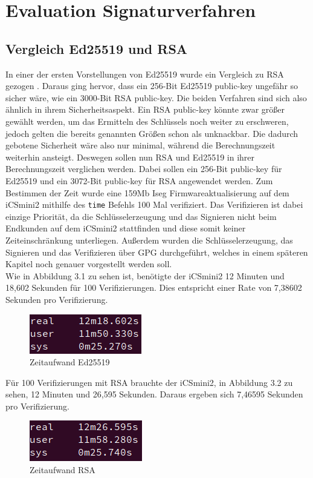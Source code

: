 \documentclass[thesis=bachelor,faculty=cb]{hsmw-thesis}
\begin{document}
\chapter{Evaluation Signaturverfahren}
\section{Vergleich Ed25519 und RSA}
In einer der ersten Vorstellungen von Ed25519 wurde ein Vergleich zu RSA gezogen \cite[Vgl. S.2]{ed25519_paper}. Daraus ging hervor, dass ein 256-Bit Ed25519 public-key ungefähr so sicher wäre, wie ein 3000-Bit RSA public-key. Die beiden Verfahren sind sich also ähnlich in ihrem Sicherheitsaspekt. Ein RSA public-key könnte zwar größer gewählt werden, um das Ermitteln des Schlüssels noch weiter zu erschweren, jedoch gelten die bereits genannten Größen schon als unknackbar. Die dadurch gebotene Sicherheit wäre also nur minimal, während die Berechnungszeit weiterhin ansteigt. Deswegen sollen nun RSA und Ed25519 in ihrer Berechnungszeit verglichen werden. Dabei sollen ein 256-Bit public-key für Ed25519 und ein 3072-Bit public-key für RSA angewendet werden. Zum Bestimmen der Zeit wurde eine 159Mb Iseg Firmwareaktualisierung auf dem iCSmini2 mithilfe des \texttt{time} Befehls 100 Mal verifiziert. Das Verifizieren ist dabei einzige Priorität, da die Schlüsselerzeugung und das Signieren nicht beim Endkunden auf dem iCSmini2 stattfinden und diese somit keiner Zeiteinschränkung unterliegen. Außerdem wurden die Schlüsselerzeugung, das Signieren und das Verifizieren über GPG durchgeführt, welches in einem späteren Kapitel noch genauer vorgestellt werden soll.
\\[1cm]
Wie in Abbildung 3.1 zu sehen ist, benötigte der iCSmini2 12 Minuten und 18,602 Sekunden für 100 Verifizierungen. Dies entspricht einer Rate von 7,38602 Sekunden pro Verifizierung.
\begin{figure}[H]
	\centering
	\includegraphics[scale=0.8]{images/ICSMINIII_GPG.PNG}
	\caption{Zeitaufwand Ed25519}
\end{figure}

Für 100 Verifizierungen mit RSA brauchte der iCSmini2, in Abbildung 3.2 zu sehen, 12 Minuten und 26,595 Sekunden. Daraus ergeben sich 7,46595 Sekunden pro Verifizierung.  
\begin{figure}[H]
	\centering
	\includegraphics[scale=0.8]{images/ICSMINIRSA.PNG}
	\caption{Zeitaufwand RSA}
\end{figure}
\newpage
\end{document}
